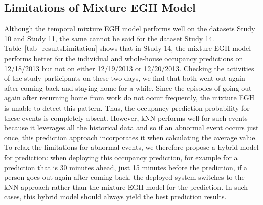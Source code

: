 \subsection{Limitations of Mixture EGH Model}
Although the temporal mixture EGH model performs well on the datasets Study 10 and Study 11, 
the same cannot be said for the dataset Study 14. 
Table~\ref{tab_resultsLimitation} shows that 
in Study 14, 
the mixture EGH model performs better for the individual and whole-house occupancy predictions on 12/18/2013 but not on either 12/19/2013 or 12/20/2013. 
Checking the activities of the study participants on these two days, 
we find that both went out again 
after coming back and staying home for a while.
Since the episodes of going out again after returning home from work 
do not occur frequently, the mixture EGH is unable to detect this pattern. 
Thus, the occupancy prediction probability for these events 
is completely absent. However, kNN performs well for such events because it leverages all the 
historical data and so if an abnormal event occurs just once, 
this prediction approach incorporates it when calculating the average value. 
To relax the limitations for abnormal events, 
we therefore propose a hybrid model for prediction:
when deploying this occupancy prediction, 
for example for a prediction that is 30 minutes ahead, 
just 15 minutes before the prediction, if a person goes out again after coming back, 
the deployed system switches to the kNN approach rather than the mixture EGH model for the prediction. 
In such cases, this hybrid model should always yield the best prediction results. 

